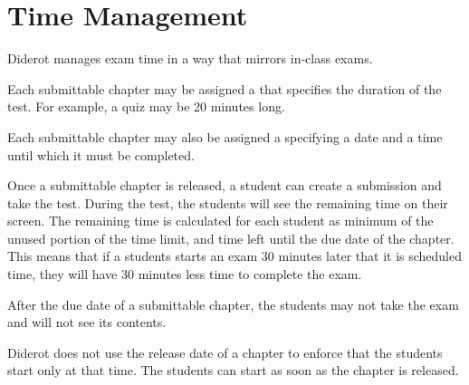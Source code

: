 \section{Time Management}
\label{ch:quiz::time-management}

\begin{cluster}
\label{grp:grm:quiz::manages}

\begin{gram}
\label{grm:quiz::manages}
Diderot manages exam time in a way that mirrors in-class exams.

\end{gram}
\end{cluster}

\begin{cluster}
\label{grp:grm:quiz::time-limit-and-due-date}

\begin{gram}
\label{grm:quiz::time-limit-and-due-date}
Each submittable chapter may be assigned a  that
specifies the duration of the test.  For example, a quiz may be 20
minutes long.

Each submittable chapter may also be assigned a  specifying a date and a time until which it must be completed. 

\end{gram}
\end{cluster}

\begin{cluster}
\label{grp:grm:quiz::taking-the-exam}

\begin{gram}
\label{grm:quiz::taking-the-exam}
Once a submittable chapter is released, a student can create a submission and take the test.  During the test, the students will see the remaining time on their screen.  The remaining time is calculated for each student as minimum of the unused portion of the time limit, and time left until the due date of the chapter.  This means that if a students starts an exam 30 minutes later that it is scheduled time, they will have 30 minutes less time to complete the exam.

After the due date of a submittable chapter, the students may not take the exam and will not see its contents.

Diderot does not use the release date of a chapter to enforce that the students start only at that time.  The students can start as soon as the chapter is released.

\end{gram}
\end{cluster}


